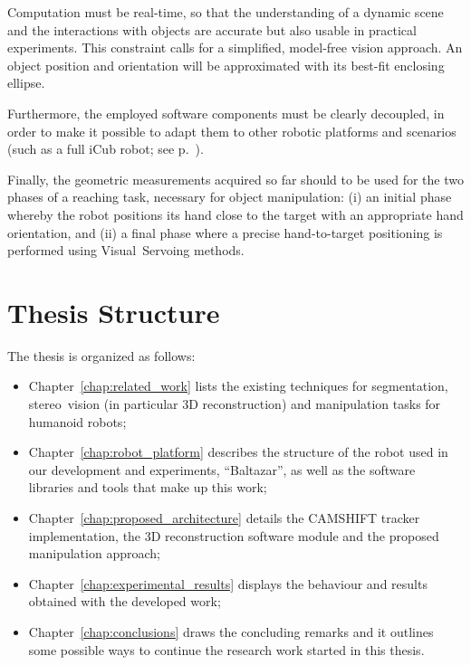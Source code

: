 Computation must be real-time, so that the understanding of a dynamic scene and the interactions with objects are accurate but also usable in practical experiments. This constraint calls for a simplified, model-free vision approach. An object position and orientation will be approximated with its best-fit enclosing ellipse.

Furthermore, the employed software components must be clearly decoupled, in order to make it possible to adapt them to other robotic platforms and scenarios (such as a full iCub robot; see p.~\pageref{icub}).

Finally, the geometric measurements acquired so far should to be used for the two phases of a reaching task, necessary for object manipulation: (i) an initial phase whereby the robot positions its hand close to the target with an appropriate hand orientation, and (ii) a final phase where a precise hand-to-target positioning is performed using Visual~Servoing methods.

\section{Thesis Structure}

The thesis is organized as follows:

%
\begin{itemize}
\item Chapter~\ref{chap:related_work} lists the existing techniques for segmentation, stereo~vision (in particular 3D reconstruction) and manipulation tasks for humanoid robots;

\item Chapter~\ref{chap:robot_platform} describes the structure of the robot used in our development and experiments, ``Baltazar'', as well as the software libraries and tools that make up this work;

\item Chapter~\ref{chap:proposed_architecture} details the \ac{CAMSHIFT} tracker implementation, the 3D reconstruction software module and the proposed manipulation approach;

\item Chapter~\ref{chap:experimental_results} displays the behaviour and results obtained with the developed work;

\item Chapter~\ref{chap:conclusions} draws the concluding remarks and it outlines some possible ways to continue the research work started in this thesis.
\end{itemize}